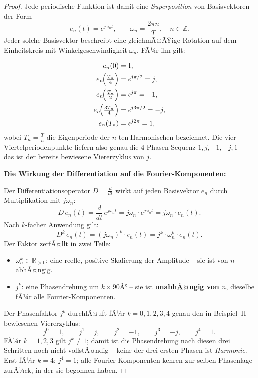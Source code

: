 ﻿\documentclass[a4paper,12pt]{article}
\theoremstyle{definition}
\begin{document}
\begin{proof}
Jede periodische Funktion ist damit eine \textit{Superposition} von Basisvektoren
der Form
\begin{equation}
	e_n(t) = e^{j\omega_n t}, \qquad \omega_n = \frac{2\pi n}{T}, \quad n \in \mathbb{Z}.
\end{equation}
Jeder solche Basisvektor beschreibt eine gleichmÃ¤ÃŸige Rotation auf dem Einheitskreis
mit Winkelgeschwindigkeit $\omega_n$. FÃ¼r ihn gilt:

\begin{align*}
	e_n(0) &= 1, \\
	e_n\!\Bigl(\tfrac{T_n}{4}\Bigr) &= e^{j\pi/2} = j, \\
	e_n\!\Bigl(\tfrac{T_n}{2}\Bigr) &= e^{j\pi} = -1, \\
	e_n\!\Bigl(\tfrac{3T_n}{4}\Bigr) &= e^{j3\pi/2} = -j, \\
	e_n(T_n) &= e^{j2\pi} = 1,
\end{align*}
wobei $T_n = \tfrac{T}{n}$ die Eigenperiode der $n$-ten Harmonischen bezeichnet.
Die vier Viertelperiodenpunkte liefern also genau die 4-Phasen-Sequenz
$1, j, -1, -j, 1$ -- das ist der bereits bewiesene Viererzyklus von $j$.

\medskip
\textbf{Die Wirkung der Differentiation auf die Fourier-Komponenten:}

Der Differentiationsoperator $D = \tfrac{d}{dt}$ wirkt auf jeden Basisvektor $e_n$
durch Multiplikation mit $j\omega_n$:
\begin{equation}
	D\, e_n(t) = \frac{d}{dt}\, e^{j\omega_n t} = j\omega_n \cdot e^{j\omega_n t}
	= j\omega_n \cdot e_n(t).
\end{equation}
Nach $k$-facher Anwendung gilt:
\begin{equation}
	D^k\, e_n(t) = (j\omega_n)^k \cdot e_n(t) = j^k \cdot \omega_n^k \cdot e_n(t).
\end{equation}
Der Faktor zerfÃ¤llt in zwei Teile:
\begin{itemize}
	\item $\omega_n^k \in \mathbb{R}_{>0}$: eine reelle, positive Skalierung der
	      Amplitude -- sie ist von $n$ abhÃ¤ngig.
	\item $j^k$: eine Phasendrehung um $k \times 90Â°$ -- sie ist \textbf{unabhÃ¤ngig
	      von $n$}, dieselbe fÃ¼r alle Fourier-Komponenten.
\end{itemize}
Der Phasenfaktor $j^k$ durchlÃ¤uft fÃ¼r $k = 0, 1, 2, 3, 4$ genau den in Beispiel~II
bewiesenen Viererzyklus:
\begin{equation}
	j^0 = 1, \qquad j^1 = j, \qquad j^2 = -1, \qquad j^3 = -j, \qquad j^4 = 1.
\end{equation}
FÃ¼r $k = 1, 2, 3$ gilt $j^k \neq 1$; damit ist die Phasendrehung nach diesen
drei Schritten noch nicht vollstÃ¤ndig -- keine der drei ersten Phasen ist
\textit{Harmonie}. Erst fÃ¼r $k = 4$: $j^4 = 1$; alle Fourier-Komponenten
kehren zur selben Phasenlage zurÃ¼ck, in der sie begonnen haben.


\end{proof}
\end{document}
